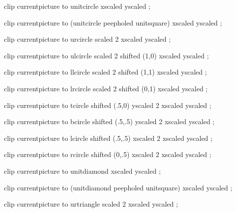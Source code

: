 

  clip currentpicture to unitcircle 
    xscaled \width yscaled \height ;
\stopMPclip

  clip currentpicture to (unitcircle peepholed unitsquare) 
    xscaled \width yscaled \height ;
\stopMPclip

  clip currentpicture to urcircle scaled 2 
    xscaled \width yscaled \height ;
\stopMPclip

  clip currentpicture to ulcircle scaled 2 shifted (1,0)
    xscaled \width yscaled \height ;
\stopMPclip

  clip currentpicture to llcircle scaled 2 shifted (1,1)
    xscaled \width yscaled \height ;
\stopMPclip

  clip currentpicture to lrcircle scaled 2 shifted (0,1)
    xscaled \width yscaled \height ;
\stopMPclip

  clip currentpicture to tcircle shifted (.5,0) yscaled 2
    xscaled \width yscaled \height ;
\stopMPclip

  clip currentpicture to bcircle shifted (.5,.5) yscaled 2
    xscaled \width yscaled \height ;
\stopMPclip

  clip currentpicture to lcircle shifted (.5,.5) xscaled 2
    xscaled \width yscaled \height ;
\stopMPclip

  clip currentpicture to rcircle shifted (0,.5) xscaled 2
    xscaled \width yscaled \height ;
\stopMPclip

  clip currentpicture to unitdiamond 
    xscaled \width yscaled \height ;
\stopMPclip

  clip currentpicture to (unitdiamond peepholed unitsquare) 
    xscaled \width yscaled \height ;
\stopMPclip

  clip currentpicture to urtriangle scaled 2 
    xscaled \width yscaled \height ;
\stopMPclip

